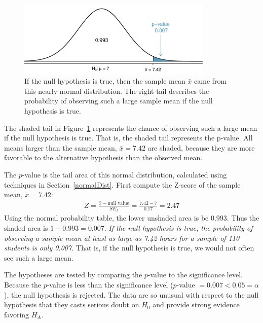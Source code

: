 \begin{spacing}{1.5}
\begin{figure}[hht]
   \centering
   \includegraphics[width=0.83\textwidth]{ch_inference_foundations_oi_biostat/figures/pValueOneSidedSleepStudy/pValueOneSidedSleepStudy}
   \caption{If the null hypothesis is true, then the sample mean $\bar{x}$ came from this nearly normal distribution. The right tail describes the probability of observing such a large sample mean if the null hypothesis is true.}
   \label{pValueOneSidedSleepStudy}
\end{figure}

The shaded tail in Figure~\ref{pValueOneSidedSleepStudy} represents the chance of observing such a large mean if the null hypothesis is true. That is, the shaded tail represents the \mbox{p-value}. All means larger than the sample mean, $\bar{x} = 7.42$ are shaded, because they are more favorable to the alternative hypothesis than the observed mean.

The $p$-value is the tail area of this normal distribution, calculated using techniques in Section~\ref{normalDist}. First compute the Z-score of the sample mean, $\bar{x} = 7.42$:
\begin{eqnarray*}
Z = \frac{\bar{x} - \text{null value}}{SE_{\bar{x}}} = \frac{7.42 - 7}{0.17} = 2.47
\end{eqnarray*}
Using the normal probability table, the lower unshaded area is  be 0.993. Thus the shaded area is $1-0.993 = 0.007$. {\em If the null hypothesis is true, the probability of observing a sample mean at least as large as 7.42 hours for a sample of 110 students is only 0.007.} That is, if the null hypothesis is true, we would not often see such a large mean.

The hypotheses are tested by comparing the $p$-value to the significance level. Because the $p$-value is less than the significance level ($p$-value $=0.007 < 0.05=\alpha$), the null hypothesis is rejected. The data are so unusual with respect to the null hypothesis that they casts serious doubt on $H_0$ and provide strong evidence favoring $H_A$.


\end{spacing}

